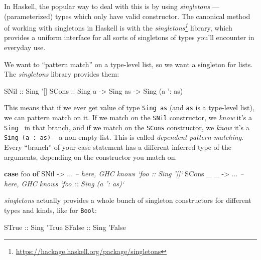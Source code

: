 \documentclass[]{article}
\newenvironment{Shaded}{\begin{snugshade}}{\end{snugshade}}
\newcommand{\CharTok}[1]{\textcolor[rgb]{0.31,0.60,0.02}{#1}}
\newcommand{\CommentTok}[1]{\textcolor[rgb]{0.56,0.35,0.01}{\textit{#1}}}
\newcommand{\DataTypeTok}[1]{\textcolor[rgb]{0.13,0.29,0.53}{#1}}
\newcommand{\FunctionTok}[1]{\textcolor[rgb]{0.00,0.00,0.00}{#1}}
\newcommand{\KeywordTok}[1]{\textcolor[rgb]{0.13,0.29,0.53}{\textbf{#1}}}
\newcommand{\NormalTok}[1]{#1}
\newcommand{\OtherTok}[1]{\textcolor[rgb]{0.56,0.35,0.01}{#1}}
\renewcommand{\href}[2]{#2\footnote{\url{#1}}}
\begin{document}
In Haskell, the popular way to deal with this is by using \emph{singletons} ---
(parameterized) types which only have valid constructor. The canonical method of
working with singletons in Haskell is with the
\emph{\href{https://hackage.haskell.org/package/singletons}{singletons}}
library, which provides a uniform interface for all sorts of singletons of types
you'll encounter in everyday use.

We want to ``pattern match'' on a type-level list, so we want a singleton for
lists. The \emph{singletons} library provides them:

\begin{Shaded}
\begin{Highlighting}[]
\DataTypeTok{SNil}\OtherTok{  ::} \DataTypeTok{Sing} \CharTok{'[]}
\DataTypeTok{SCons}\OtherTok{ ::} \DataTypeTok{Sing}\NormalTok{ a }\OtherTok{->} \DataTypeTok{Sing}\NormalTok{ as }\OtherTok{->} \DataTypeTok{Sing}\NormalTok{ (a }\CharTok{': as)}
\end{Highlighting}
\end{Shaded}

This means that if we ever get value of type \texttt{Sing\ as} (and \texttt{as}
is a type-level list), we can pattern match on it. If we match on the
\texttt{SNil} constructor, we \emph{know} it's a
\texttt{Sing\ \textquotesingle{}{[}{]}} in that branch, and if we match on the
\texttt{SCons} constructor, we \emph{know} it's a
\texttt{Sing\ (a\ \textquotesingle{}:\ as)} -- a non-empty list. This is called
\emph{dependent pattern matching}. Every ``branch'' of your case statement has a
different inferred type of the arguments, depending on the constructor you match
on.

\begin{Shaded}
\begin{Highlighting}[]
\KeywordTok{case}\NormalTok{ foo }\KeywordTok{of}
  \DataTypeTok{SNil}      \OtherTok{->} \FunctionTok{...}   \CommentTok{-- here, GHC knows `foo :: Sing '[]`}
  \DataTypeTok{SCons}\NormalTok{ _ _ }\OtherTok{->} \FunctionTok{...}   \CommentTok{-- here, GHC knows `foo :: Sing (a ': as)`}
\end{Highlighting}
\end{Shaded}

\emph{singletons} actually provides a whole bunch of singleton constructors for
different types and kinds, like for \texttt{Bool}:

\begin{Shaded}
\begin{Highlighting}[]
\DataTypeTok{STrue}\OtherTok{  ::} \DataTypeTok{Sing} \CharTok{'True}
\DataTypeTok{SFalse}\OtherTok{ ::} \DataTypeTok{Sing} \CharTok{'False}
\end{Highlighting}
\end{Shaded}
\end{document}
